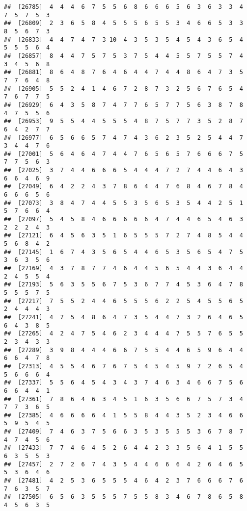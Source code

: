 \documentclass[
]{book}
\begin{document}
\begin{verbatim}
##  [26785]  4  4  4  6  7  5  5  6  8  6  6  6  5  6  3  6  3  3  4  7  5  7  5  3
##  [26809]  2  3  6  5  8  4  5  5  5  6  5  5  3  4  6  6  5  3  3  8  5  6  7  3
##  [26833]  4  4  7  4  7  3 10  4  3  5  3  5  4  5  4  3  6  5  4  5  5  5  6  4
##  [26857]  8  4  4  7  5  7  5  3  7  5  4  4  5  5  7  5  5  7  4  3  4  5  6  8
##  [26881]  8  6  4  8  7  6  4  6  4  4  7  4  4  8  6  4  7  3  5  7  7  6  4  8
##  [26905]  5  5  2  4  1  4  6  7  2  8  7  3  2  5  6  7  6  5  4  7  6  7  7  5
##  [26929]  6  4  3  5  8  7  4  7  7  6  5  7  7  5  6  3  8  7  8  4  7  5  5  6
##  [26953]  9  5  5  4  4  5  5  5  4  8  7  5  7  7  3  5  2  8  7  6  4  2  7  7
##  [26977]  6  5  6  6  5  7  4  7  4  3  6  2  3  5  2  5  4  4  7  3  4  4  7  6
##  [27001]  5  6  4  6  4  7  4  4  7  6  5  6  5  7  6  6  6  7  5  7  7  5  6  3
##  [27025]  3  7  4  4  6  6  6  5  4  4  4  7  2  7  4  4  6  4  3  6  6  4  6  9
##  [27049]  6  4  2  2  4  3  7  8  6  4  4  7  6  8  4  6  7  8  4  6  6  6  5  6
##  [27073]  3  8  4  7  4  4  5  5  3  5  6  5  3  5  4  4  2  5  1  5  7  6  6  4
##  [27097]  5  4  5  8  4  6  6  6  6  6  4  7  4  4  6  5  4  6  3  2  2  2  4  3
##  [27121]  6  4  5  6  3  5  1  6  5  5  5  7  2  7  4  8  5  4  4  5  6  8  4  2
##  [27145]  1  6  7  4  3  5  6  5  4  4  6  5  3  5  6  5  4  7  5  3  6  3  5  6
##  [27169]  4  3  7  8  7  7  4  6  4  4  5  6  5  4  4  3  6  4  4  2  4  5  5  4
##  [27193]  5  6  3  5  5  6  7  5  3  6  7  7  4  5  3  6  4  7  8  5  5  5  7  5
##  [27217]  7  5  5  2  4  4  6  5  5  5  6  2  2  5  4  5  5  6  5  2  4  4  4  3
##  [27241]  4  7  5  4  8  6  4  7  3  5  4  4  7  3  2  6  4  6  5  6  4  3  8  5
##  [27265]  4  2  4  7  5  4  6  2  3  4  4  4  7  5  5  7  6  5  5  2  3  4  3  3
##  [27289]  3  9  8  4  4  4  6  6  7  5  5  4  4  6  5  9  6  4  4  6  6  4  7  8
##  [27313]  4  5  5  4  6  7  6  7  5  4  5  4  5  9  7  2  6  5  4  5  6  6  6  4
##  [27337]  5  5  6  4  5  4  3  4  3  7  4  6  3  4  6  6  7  5  6  6  6  4  4  1
##  [27361]  7  8  6  4  6  3  4  5  1  6  3  5  6  6  7  5  7  3  4  7  7  3  6  5
##  [27385]  4  6  6  6  6  4  1  5  5  8  4  4  3  5  2  3  4  6  6  5  9  5  4  5
##  [27409]  7  4  6  3  7  5  6  6  3  5  3  5  5  5  3  6  7  8  7  4  7  4  5  6
##  [27433]  7  7  4  6  4  5  2  6  4  4  2  3  3  5  6  4  1  5  5  6  3  5  5  3
##  [27457]  2  7  2  6  7  4  3  5  4  4  6  6  6  4  2  6  4  6  5  5  3  6  4  6
##  [27481]  4  2  5  3  6  5  5  5  4  6  4  2  3  7  6  6  6  7  6  7  6  3  5  7
##  [27505]  6  5  6  3  5  5  5  7  5  5  8  3  4  6  7  8  6  5  8  4  5  6  3  5

\end{verbatim}
\end{document}
